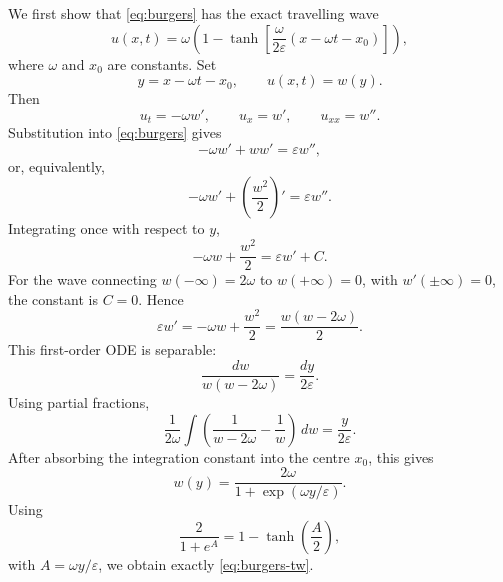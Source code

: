 \documentclass[11pt]{article}
\begin{document}
We first show that \eqref{eq:burgers} has the exact travelling wave
\begin{equation}
    u(x,t)
    =
    \omega\left(1-\tanh\left[
    \frac{\omega}{2\varepsilon}(x-\omega t-x_0)
    \right]\right),
    \label{eq:burgers-tw}
\end{equation}
where $\omega$ and $x_0$ are constants.  Set
\begin{equation}
    y=x-\omega t-x_0,
    \qquad
    u(x,t)=w(y).
\end{equation}
Then
\begin{equation}
    u_t=-\omega w',
    \qquad
    u_x=w',
    \qquad
    u_{xx}=w''.
\end{equation}
Substitution into \eqref{eq:burgers} gives
\begin{equation}
    -\omega w'+w w'=\varepsilon w'',
\end{equation}
or, equivalently,
\begin{equation}
    -\omega w'+\left(\frac{w^2}{2}\right)'=\varepsilon w''.
\end{equation}
Integrating once with respect to $y$,
\begin{equation}
    -\omega w+\frac{w^2}{2}=\varepsilon w' + C.
\end{equation}
For the wave connecting $w(-\infty)=2\omega$ to $w(+\infty)=0$, with $w'(\pm\infty)=0$, the constant is $C=0$.  Hence
\begin{equation}
    \varepsilon w'
    =
    -\omega w+\frac{w^2}{2}
    =
    \frac{w(w-2\omega)}{2}.
    \label{eq:burgers-wave-ode}
\end{equation}
This first-order ODE is separable:
\begin{equation}
    \frac{dw}{w(w-2\omega)}
    =
    \frac{dy}{2\varepsilon}.
\end{equation}
Using partial fractions,
\begin{equation}
    \frac{1}{2\omega}
    \int\left(\frac{1}{w-2\omega}-\frac{1}{w}\right)\,dw
    =
    \frac{y}{2\varepsilon}.
\end{equation}
After absorbing the integration constant into the centre $x_0$, this gives
\begin{equation}
    w(y)=\frac{2\omega}{1+\exp(\omega y/\varepsilon)}.
\end{equation}
Using
\begin{equation}
    \frac{2}{1+e^A}=1-\tanh\left(\frac{A}{2}\right),
\end{equation}
with $A=\omega y/\varepsilon$, we obtain exactly \eqref{eq:burgers-tw}.
\end{document}
